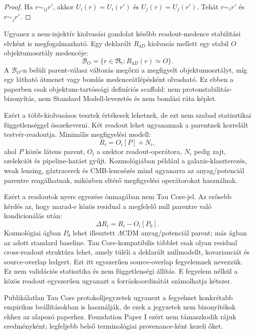 \documentclass[12pt]{article}
\newcommand{\RTspace}{\mathfrak R_{\tau}}
\begin{document}
\begin{proof}
Ha \(r\sim_{ij}r'\), akkor \(U_i(r)=U_i(r')\) és \(U_j(r)=U_j(r')\).  Tehát
\(r\sim_i r'\) és \(r\sim_j r'\).
\end{proof}

Ugyanez a nem-injektív kiolvasási gondolat később readout-medence
stabilitási elvként is megfogalmazható.  Egy deklarált \(R_{4D}\) kiolvasás
mellett egy stabil \(O\) objektumosztály medencéje:
\[
  \mathcal B_O=\{r\in\RTspace: R_{4D}(r)\simeq O\}.
\]
A \(\mathcal B_O\)-n belüli parent-válasz változás megőrzi a megfigyelt
objektumosztályt, míg egy látható átmenet vagy bomlás medenceátlépésként
olvasható.  Ez ebben a paperben csak objektum-tartóssági definíciós scaffold:
nem protonstabilitás-bizonyítás, nem Standard Modell-levezetés és nem
bomlási ráta képlet.

Ezért a több-kiolvasásos tesztek értékesek lehetnek, de ezt nem szabad
statisztikai függetlenséggel összekeverni.  Két readout lehet ugyanannak a
parentnek korrelált testvér-readoutja.  Minimális megfigyelési modell:
\[
  R_i=O_i[P]+N_i,
\]
ahol \(P\) közös látens parent, \(O_i\) a szektor readout-operátora, \(N_i\)
pedig zajt, szelekciót és pipeline-hatást gyűjt.  Kozmológiában például a
galaxis-klaszterezés, weak lensing, gáztracerek és CMB-lencsézés mind
ugyanarra az anyag/potenciál parentre reagálhatnak, miközben eltérő
megfigyelési operátorokat használnak.

Ezért a readoutok nyers egyezése önmagában nem Tau Core-jel.  Az erősebb kérdés
az, hogy marad-e közös residual a megfelelő null parentre való kondicionálás
után:
\[
  \Delta R_i=R_i-O_i[P_0].
\]
Kozmológiai ágban \(P_0\) lehet illesztett \(\Lambda\)CDM anyag/potenciál
parent; más ágban az adott standard baseline.  Tau Core-kompatibilis többlet
csak olyan residual cross-readout struktúra lehet, amely túléli a deklarált
nullmodellt, kovarianciát és source-overlap ledgert.  Ezt itt egyszerűen
source-overlap fegyelemnek nevezzük.  Ez nem validációs statisztika és nem
függetlenségi állítás.  E fegyelem nélkül a közös readout egyszerűen ugyanazt
a forráskoordinátát számolhatja kétszer.

Publikálatlan Tau Core protokolljegyzetek ugyanezt a fegyelmet konkrétabb
empirikus beállításokban is használják, de ezek a jegyzetek nem bizonyítékok
ehhez az alapozó paperhez.  Foundation Paper I ezért nem támaszkodik rájuk
eredményként; legfeljebb belső terminológiai provenance-ként kezeli őket.
\end{document}
